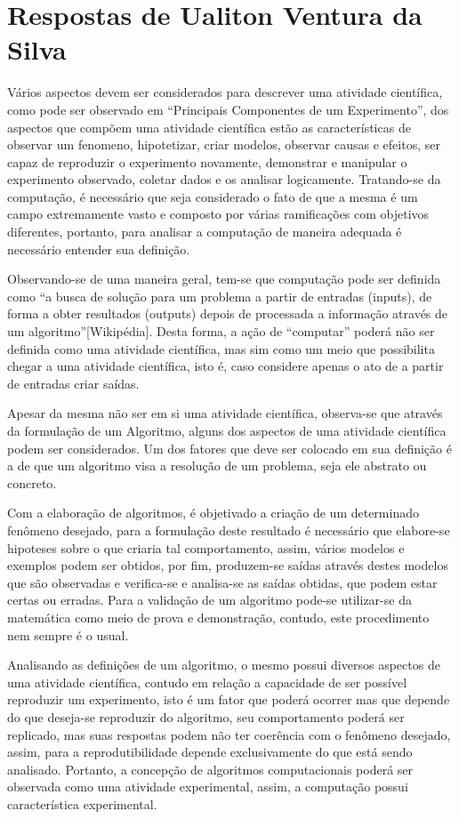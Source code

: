 \section{Respostas de Ualiton Ventura da Silva\label{tarefa-ualiton-ventura-componentes-eperimento}}

Vários aspectos devem ser considerados para descrever uma atividade científica, como pode ser observado em “Principais Componentes de um Experimento”, dos aspectos que compõem uma atividade científica estão as características de observar um \gls{fenomeno}, hipotetizar, criar modelos, observar causas e efeitos, ser capaz de reproduzir o experimento novamente, demonstrar e manipular o experimento observado, coletar dados e os analisar logicamente. Tratando-se da computação, é necessário que seja considerado o fato de que a mesma é um campo extremamente vasto e composto por várias ramificações com objetivos diferentes, portanto, para analisar a computação de maneira adequada é necessário entender sua definição.

Observando-se de uma maneira geral, tem-se que computação pode ser definida como “a busca de solução para um problema a partir de entradas (inputs), de forma a obter resultados (outputs) depois de processada a informação através de um algoritmo”[Wikipédia]. Desta forma, a ação de “computar” poderá não ser definida como uma atividade científica, mas sim como um meio que possibilita chegar a uma atividade científica, isto é, caso considere apenas o ato de a partir de entradas criar saídas.

Apesar da mesma não ser em si uma atividade científica, observa-se que através da formulação de um \gls{Algoritmo}, alguns dos aspectos de uma atividade científica podem ser considerados. Um dos fatores que deve ser colocado em sua definição é a de que um algoritmo visa a resolução de um problema, seja ele abstrato ou concreto.

Com a elaboração de algoritmos, é objetivado a criação de um determinado fenômeno desejado, para a formulação deste resultado é necessário que elabore-se \gls{hipotese}s sobre o que criaria tal comportamento, assim, vários modelos e exemplos podem ser obtidos, por fim, produzem-se saídas através destes modelos que são observadas e verifica-se e analisa-se as saídas obtidas, que podem estar certas ou erradas. Para a validação de um algoritmo pode-se utilizar-se da matemática como meio de prova e demonstração, contudo, este procedimento nem sempre é o usual.
 
Analisando as definições de um algoritmo, o mesmo possui diversos aspectos de uma atividade científica, contudo em relação a capacidade de ser possível reproduzir um experimento, isto é um fator que poderá ocorrer mas que depende do que deseja-se reproduzir do algoritmo, seu comportamento poderá ser replicado, mas suas respostas podem não ter coerência com o fenômeno desejado, assim, para a reprodutibilidade depende exclusivamente do que está sendo analisado. Portanto, a concepção de algoritmos computacionais poderá ser observada como uma atividade experimental, assim, a computação possui característica experimental.

